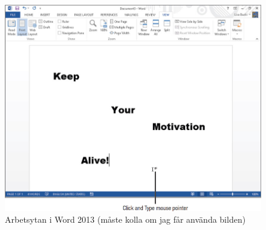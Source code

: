 \begin{figure}[ht]
	\centering
	\includegraphics[scale=0.4]{dennis-grafik/word2.jpg}
	\caption{Arbetsytan i Word 2013 (måste kolla om jag får använda bilden)}\label{fig:word2}	
\end{figure} 

